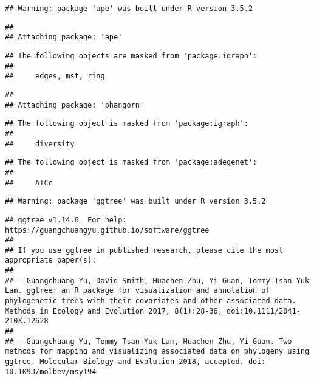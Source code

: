 \documentclass[
]{article}
\newenvironment{Shaded}{\begin{snugshade}}{\end{snugshade}}
\newcommand{\AttributeTok}[1]{\textcolor[rgb]{0.77,0.63,0.00}{#1}}
\newcommand{\CommentTok}[1]{\textcolor[rgb]{0.56,0.35,0.01}{\textit{#1}}}
\newcommand{\FunctionTok}[1]{\textcolor[rgb]{0.00,0.00,0.00}{#1}}
\newcommand{\NormalTok}[1]{#1}
\newcommand{\SpecialCharTok}[1]{\textcolor[rgb]{0.00,0.00,0.00}{#1}}
\newcommand{\StringTok}[1]{\textcolor[rgb]{0.31,0.60,0.02}{#1}}
\begin{document}
\begin{verbatim}
## Warning: package 'ape' was built under R version 3.5.2
\end{verbatim}

\begin{verbatim}
## 
## Attaching package: 'ape'
\end{verbatim}

\begin{verbatim}
## The following objects are masked from 'package:igraph':
## 
##     edges, mst, ring
\end{verbatim}

\begin{verbatim}
## 
## Attaching package: 'phangorn'
\end{verbatim}

\begin{verbatim}
## The following object is masked from 'package:igraph':
## 
##     diversity
\end{verbatim}

\begin{verbatim}
## The following object is masked from 'package:adegenet':
## 
##     AICc
\end{verbatim}

\begin{Shaded}
\end{Shaded}

\begin{verbatim}
## Warning: package 'ggtree' was built under R version 3.5.2
\end{verbatim}

\begin{verbatim}
## ggtree v1.14.6  For help: https://guangchuangyu.github.io/software/ggtree
## 
## If you use ggtree in published research, please cite the most appropriate paper(s):
## 
## - Guangchuang Yu, David Smith, Huachen Zhu, Yi Guan, Tommy Tsan-Yuk Lam. ggtree: an R package for visualization and annotation of phylogenetic trees with their covariates and other associated data. Methods in Ecology and Evolution 2017, 8(1):28-36, doi:10.1111/2041-210X.12628
## 
## - Guangchuang Yu, Tommy Tsan-Yuk Lam, Huachen Zhu, Yi Guan. Two methods for mapping and visualizing associated data on phylogeny using ggtree. Molecular Biology and Evolution 2018, accepted. doi: 10.1093/molbev/msy194
\end{verbatim}
\end{document}
